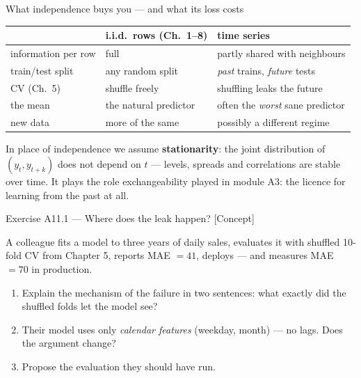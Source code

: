 \documentclass[aspectratio=169,11pt]{beamer}
\begin{document}
\begin{frame}{What independence buys you --- and what its loss costs}
  \begin{center}
  \footnotesize
  \begin{tabular}{@{}lll@{}}
    \toprule
    & \textbf{i.i.d.\ rows (Ch.\ 1--8)} & \textbf{time series} \\
    \midrule
    information per row & full & partly shared with neighbours \\
    train/test split & any random split & \emph{past} trains, \emph{future} tests \\
    CV (Ch.\ 5) & shuffle freely & shuffling leaks the future \\
    the mean & the natural predictor & often the \emph{worst} sane predictor \\
    new data & more of the same & possibly a different regime \\
    \bottomrule
  \end{tabular}
  \end{center}
  \begin{readme}
    \footnotesize
    In place of independence we assume \textbf{stationarity}: the joint distribution
    of $(y_t, y_{t+k})$ does not depend on $t$ --- levels, spreads and correlations
    are stable over time. It plays the role exchangeability played in module A3:
    the licence for learning from the past at all.
  \end{readme}
\end{frame}

\begin{frame}{Exercise A11.1 --- Where does the leak happen? [Concept]}
  \begin{exercise}
    A colleague fits a model to three years of daily sales, evaluates it with
    shuffled 10-fold CV from Chapter 5, reports MAE $= 41$, deploys --- and
    measures MAE $= 70$ in production.
    \begin{enumerate}
      \item Explain the mechanism of the failure in two sentences: what exactly did
            the shuffled folds let the model see?
      \item Their model uses only \emph{calendar features} (weekday, month) --- no
            lags. Does the argument change?
      \item Propose the evaluation they should have run.
    \end{enumerate}
  \end{exercise}
\end{frame}
\end{document}
